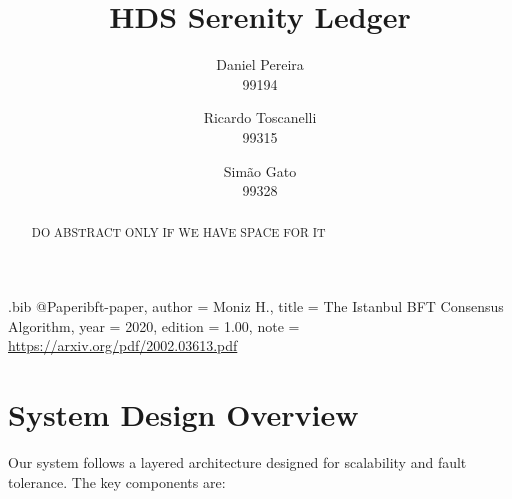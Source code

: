 \usepackage{filecontents}

\begin{filecontents}{\jobname.bib}
@Paper{ibft-paper,
  author =       {Moniz H.},
  title =        {The Istanbul BFT Consensus Algorithm},
  year =         2020,
  edition =      {1.00},
  note =         {\url{https://arxiv.org/pdf/2002.03613.pdf}}
}
\end{filecontents}



\date{}

\title{\Large \bf HDS Serenity Ledger}

\author{
{\rm Daniel Pereira}\\
99194
\and
{\rm Ricardo Toscanelli}\\
99315
\and
{\rm Simão Gato}\\
99328
} %

\maketitle

\begin{abstract}
DO ABSTRACT ONLY IF WE HAVE SPACE FOR IT
\end{abstract}


\section{System Design Overview}

Our system follows a layered architecture designed for scalability and fault tolerance. The key components are:

